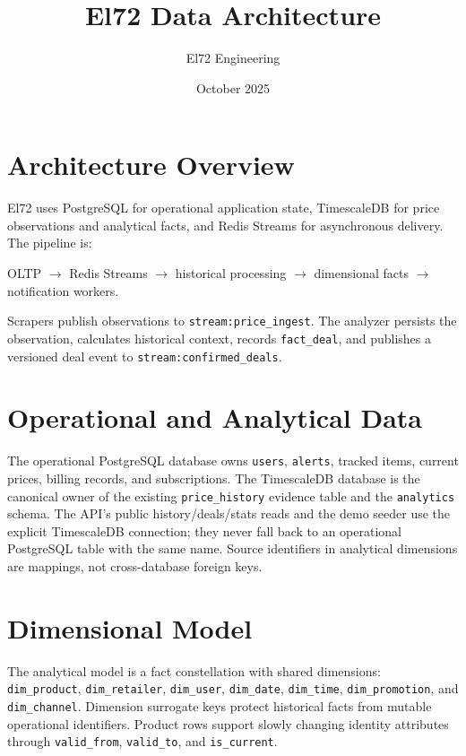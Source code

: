 \documentclass[11pt]{article}
\title{El72 Data Architecture}
\author{El72 Engineering}
\date{October 2025}
\begin{document}
\maketitle

\section{Architecture Overview}
El72 uses PostgreSQL for operational application state, TimescaleDB for price
observations and analytical facts, and Redis Streams for asynchronous delivery.
The pipeline is:
\begin{center}
OLTP $\rightarrow$ Redis Streams $\rightarrow$ historical processing
$\rightarrow$ dimensional facts $\rightarrow$ notification workers.
\end{center}
Scrapers publish observations to \texttt{stream:price\_ingest}. The analyzer
persists the observation, calculates historical context, records \texttt{fact\_deal},
and publishes a versioned deal event to \texttt{stream:confirmed\_deals}.

\section{Operational and Analytical Data}
The operational PostgreSQL database owns \texttt{users}, \texttt{alerts},
tracked items, current prices, billing records, and subscriptions. The
TimescaleDB database is the canonical owner of the existing
\texttt{price\_history} evidence table and the \texttt{analytics} schema. The
API's public history/deals/stats reads and the demo seeder use the explicit
TimescaleDB connection; they never fall back to an operational PostgreSQL
table with the same name. Source identifiers in analytical dimensions are
mappings, not cross-database foreign keys.

\section{Dimensional Model}
The analytical model is a fact constellation with shared dimensions:
\texttt{dim\_product}, \texttt{dim\_retailer}, \texttt{dim\_user},
\texttt{dim\_date}, \texttt{dim\_time}, \texttt{dim\_promotion}, and
\texttt{dim\_channel}. Dimension surrogate keys protect historical facts from
mutable operational identifiers. Product rows support slowly changing identity
attributes through \texttt{valid\_from}, \texttt{valid\_to}, and
\texttt{is\_current}.
\end{document}
